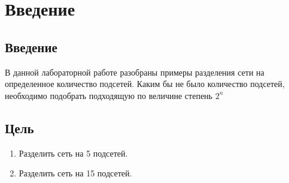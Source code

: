 \chapter{Введение}
\label{ch:intro}

\section{Введение}
В данной лабораторной работе разобраны примеры разделения сети на определенное
количество подсетей. Каким бы не было количество подсетей, необходимо подобрать
подходящую по величине степень $2^n$

\section{Цель}  

\begin{enumerate}
    \item Разделить сеть на 5 подсетей.
    \item Разделить сеть на 15 подсетей.
\end{enumerate}
  
\endinput 